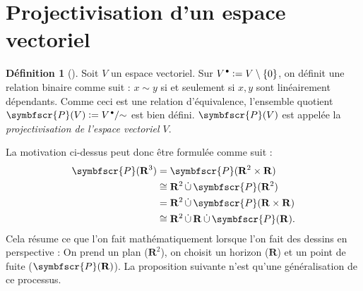 \documentclass[12pt, oneside]{memoir}
\theoremstyle{definition}
\newtheorem{defn}{Définition}
\theoremstyle{remark}
\newcommand{\unbutton}[1][.7]{\mathbin{\hspace{1pt}\vcenter{\hbox{\scalebox{#1}{$\bullet$}}}}}
\newcommand{\defeq}{\vcentcolon=}
\newcommand{\set}[1]{\{ #1 \}}
\newcommand{\proj}{\symbfscr{P}}
\newcommand{\discup}{\mathop{\dot{\cup}}}
\newcommand{\R}{\mathbf{R}}
\begin{document}
\section{Projectivisation d'un espace vectoriel}
\begin{defn}[{\cite[27]{ff00}}]
  \label{projectivization}
  Soit $V$ un espace vectoriel. Sur
  $V^{\unbutton} \defeq V \setminus \set{0}$, on définit une relation
  binaire comme suit : $x \sim y$ si et seulement si $x, y$ sont
  linéairement dépendants. Comme ceci est une relation
  d'équivalence, l'ensemble quotient
  $\proj(V) \defeq V^{\unbutton} / {\sim}$ est bien défini. $\proj(V)$
  est appelée la \textit{projectivisation de l'espace vectoriel $V$}.
\end{defn}
La motivation ci-dessus peut donc être formulée comme suit :
\begin{align*}
  \label{eq:embedding}
  \proj(\R^3) &= \proj(\R^2 \times \R) \\
              &\cong \R^2 \discup \proj(\R^2) \\
              &= \R^2 \discup \proj(\R \times \R) \\
              &\cong \R^2 \discup \R \discup \proj(\R).
\end{align*}
Cela résume ce que l'on fait mathématiquement lorsque l'on fait des
dessins en perspective : On prend un plan ($\R^2$), on choisit un
horizon ($\R$) et un point de fuite ($\proj(\R)$). La proposition
suivante n'est qu'une généralisation de ce processus.
\end{document}
